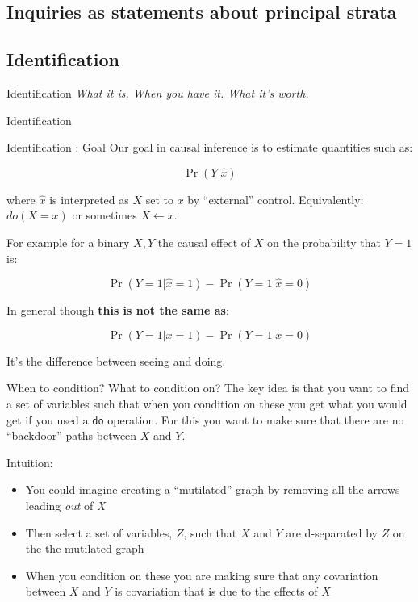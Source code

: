 \documentclass[
  11pt,
  ignorenonframetext,
]{beamer}
\providecommand{\tightlist}{%
  \setlength{\itemsep}{0pt}\setlength{\parskip}{0pt}}\usepackage{longtable,booktabs,array}
\begin{document}
\hypertarget{inquiries-as-statements-about-principal-strata}{%
\subsection{Inquiries as statements about principal
strata}\label{inquiries-as-statements-about-principal-strata}}

\hypertarget{identification}{%
\subsection{Identification}\label{identification}}

\begin{frame}{Identification}
\emph{What it is. When you have it. What it's worth.}
\end{frame}

\begin{frame}{Identification}
\protect\hypertarget{identification-1}{}
\end{frame}

\begin{frame}{Identification : Goal}
\protect\hypertarget{identification-goal}{}
Our goal in causal inference is to estimate quantities such as:

\[\Pr(Y|\hat{x})\]

where \(\hat{x}\) is interpreted as \(X\) set to \(x\) by ``external''
control. Equivalently: \(do(X=x)\) or sometimes \(X \leftarrow x\).

For example for a binary \(X, Y\) the causal effect of \(X\) on the
probability that \(Y=1\) is:

\[\Pr(Y=1|\hat{x}=1) - \Pr(Y=1|\hat{x}=0)\]

In general though \textbf{this is not the same as}:

\[\Pr(Y=1|x=1) - \Pr(Y=1|x=0)\]

It's the difference between seeing and doing.
\end{frame}

\begin{frame}[fragile]{When to condition? What to condition on?}
\protect\hypertarget{when-to-condition-what-to-condition-on}{}
The key idea is that you want to find a set of variables such that when
you condition on these you get what you would get if you used a
\texttt{do} operation. For this you want to make sure that there are no
``backdoor'' paths between \(X\) and \(Y\).

Intuition:

\begin{itemize}
\tightlist
\item
  You could imagine creating a ``mutilated'' graph by removing all the
  arrows leading \emph{out} of \emph{X}
\item
  Then select a set of variables, \(Z\), such that \(X\) and \(Y\) are
  d-separated by \(Z\) on the the mutilated graph
\item
  When you condition on these you are making sure that any covariation
  between \(X\) and \(Y\) is covariation that is due to the effects of
  \(X\)
\end{itemize}
\end{frame}
\end{document}
